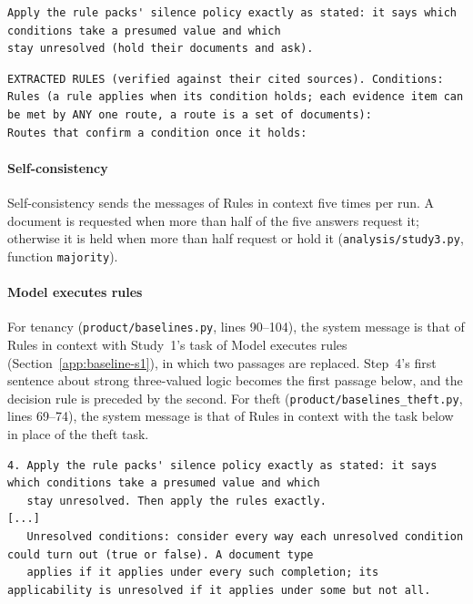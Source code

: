 \begin{lstlisting}[title={\textbf{Rules in context, tenancy: added to the task} (\texttt{v2/tenancy\_v2.py}, lines 71--73, verbatim)}]
Apply the rule packs' silence policy exactly as stated: it says which conditions take a presumed value and which
stay unresolved (hold their documents and ask).
\end{lstlisting}

\begin{lstlisting}[title={\textbf{Rules in context, theft: headings of the rules block} (\texttt{v2/theft\_v2.py}, lines 63--66, verbatim; each followed by JSON)}]
EXTRACTED RULES (verified against their cited sources). Conditions:
Rules (a rule applies when its condition holds; each evidence item can be met by ANY one route, a route is a set of documents):
Routes that confirm a condition once it holds:
\end{lstlisting}

\paragraph{Self-consistency}
Self-consistency sends the messages of Rules in context five times per run. A document is requested when more than half of the five answers request it; otherwise it is held when more than half request or hold it (\texttt{analysis/\allowbreak{}study3.py}, function \texttt{majority}).

\paragraph{Model executes rules}
For tenancy (\texttt{product/\allowbreak{}baselines.py}, lines 90--104), the system message is that of Rules in context with Study~1's task of Model executes rules (Section~\ref{app:baseline-s1}), in which two passages are replaced. Step~4's first sentence about strong three-valued logic becomes the first passage below, and the decision rule is preceded by the second. For theft (\texttt{product/\allowbreak{}baselines\_theft.py}, lines 69--74), the system message is that of Rules in context with the task below in place of the theft task.

\begin{lstlisting}[title={\textbf{Model executes rules, tenancy: the two replacing passages} (\texttt{product/baselines.py}, lines 97--98 and 101--102, verbatim)}]
4. Apply the rule packs' silence policy exactly as stated: it says which conditions take a presumed value and which
   stay unresolved. Then apply the rules exactly.
[...]
   Unresolved conditions: consider every way each unresolved condition could turn out (true or false). A document type
   applies if it applies under every such completion; its applicability is unresolved if it applies under some but not all.
\end{lstlisting}

